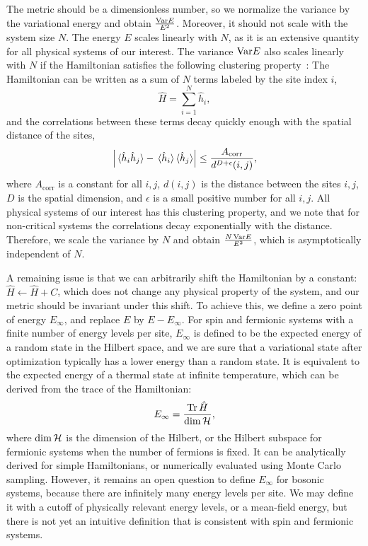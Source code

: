 The metric should be a dimensionless number, so we normalize the variance by the variational energy and obtain $\frac{\mathrm{Var} E}{E^2}$. Moreover, it should not scale with the system size $N$. The energy $E$ scales linearly with $N$, as it is an extensive quantity for all physical systems of our interest. The variance $\mathrm{Var} E$ also scales linearly with $N$ if the Hamiltonian satisfies the following clustering property~\cite{park1995uniqueness, nachtergaele2006lieb, hastings2006spectral}: The Hamiltonian can be written as a sum of $N$ terms labeled by the site index $i$,
\begin{equation}
\hat{H} = \sum_{i = 1}^N \hat{h}_i,
\end{equation}
and the correlations between these terms decay quickly enough with the spatial distance of the sites,
\begin{equation}
\left| \ev*{\hat{h}_i \hat{h}_j} - \ev*{\hat{h}_i}\!\ev*{\hat{h}_j} \right| \le \frac{A_\text{corr}}{d^{D + \epsilon}(i, j)},
\end{equation}
where $A_\text{corr}$ is a constant for all $i, j$, $d(i, j)$ is the distance between the sites $i, j$, $D$ is the spatial dimension, and $\epsilon$ is a small positive number for all $i, j$. All physical systems of our interest has this clustering property, and we note that for non-critical systems the correlations decay exponentially with the distance. Therefore, we scale the variance by $N$ and obtain $\frac{N\,\mathrm{Var} E}{E^2}$, which is asymptotically independent of $N$.

A remaining issue is that we can arbitrarily shift the Hamiltonian by a constant: $\hat{H} \gets \hat{H} + C$, which does not change any physical property of the system, and our metric should be invariant under this shift. To achieve this, we define a zero point of energy $E_\infty$, and replace $E$ by $E - E_\infty$. For spin and fermionic systems with a finite number of energy levels per site, $E_\infty$ is defined to be the expected energy of a random state in the Hilbert space, and we are sure that a variational state after optimization typically has a lower energy than a random state. It is equivalent to the expected energy of a thermal state at infinite temperature, which can be derived from the trace of the Hamiltonian:
\begin{equation}
E_\infty = \frac{\Tr \hat{H}}{\dim \mathcal{H}},
\label{eq:E-infty-trace}
\end{equation}
where $\dim \mathcal{H}$ is the dimension of the Hilbert, or the Hilbert subspace for fermionic systems when the number of fermions is fixed. It can be analytically derived for simple Hamiltonians, or numerically evaluated using Monte Carlo sampling. However, it remains an open question to define $E_\infty$ for bosonic systems, because there are infinitely many energy levels per site. We may define it with a cutoff of physically relevant energy levels, or a mean-field energy, but there is not yet an intuitive definition that is consistent with spin and fermionic systems.

